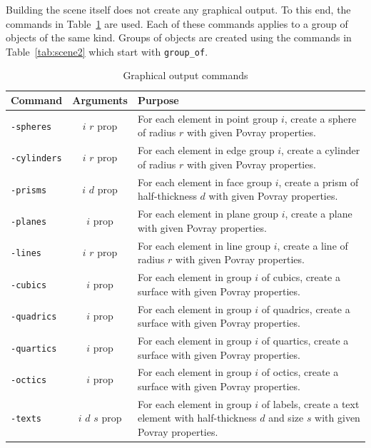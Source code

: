 Building the scene itself does not create any graphical output. 
To this end, the commands in Table~\ref{tab:3doutput} are used.
Each of these commands applies to a group of objects of the same kind. 
Groups of objects are created using the commands in 
Table~\ref{tab:scene2} which start with \verb'group_of'.
	\begin{table}
	\begin{center}
	\begin{tabular}{|p{4.5cm}|c|p{8cm}|}
		\hline
		Command & Arguments & Purpose \\
		\hline
		\hline
		\verb'-spheres' & $i$ $r$ prop & For each element in point group $i$, create a sphere of radius $r$ with given Povray properties.\\
		\hline
		\verb'-cylinders' & $i$ $r$ prop & For each element in edge group $i$, create a cylinder of radius $r$ with given Povray properties.\\
		\hline
		\verb'-prisms' & $i$ $d$ prop & For each element in face group $i$, create a prism of half-thickness $d$ with given Povray properties.\\
		\hline
		\verb'-planes' & $i$ prop & For each element in plane group $i$, create a plane with given Povray properties.\\
		\hline
		\verb'-lines' & $i$ $r$ prop & For each element in line group $i$, create a line of radius $r$ with given Povray properties.\\
		\hline
		\verb'-cubics' & $i$ prop & For each element in group $i$ of cubics, create a surface with given Povray properties.\\
		\hline
		\verb'-quadrics' & $i$ prop & For each element in group $i$ of quadrics, create a surface with given Povray properties.\\
		\hline
		\verb'-quartics' & $i$ prop & For each element in group $i$ of quartics, create a surface with given Povray properties.\\
		\hline
		\verb'-octics' & $i$ prop & For each element in group $i$ of octics, create a surface with given Povray properties.\\
		\hline
		\verb'-texts' & $i$ $d$ $s$ prop & For each element in group $i$ of labels, create a text element with half-thickness $d$ and size $s$ with given Povray properties.\\
		\hline
		\end{tabular}
	\end{center}
	\caption{\label{tab:3doutput}Graphical output commands}
	\end{table}
